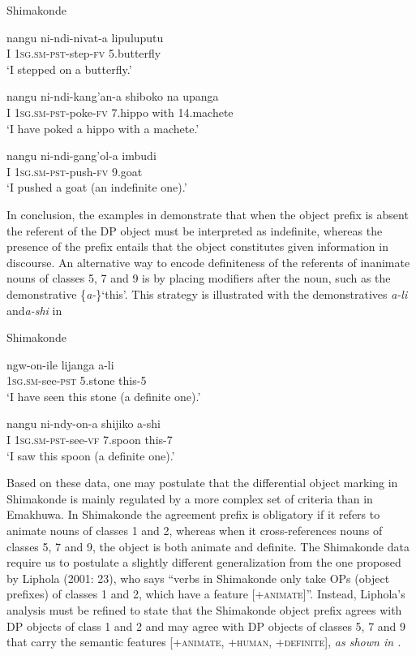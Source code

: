 \documentclass[output=paper]{langsci/langscibook}
\begin{document}
{Shimakonde}

\ea
\gll nangu        ni-ndi-nivat-a                 lipuluputu\\
     I                \textsc{1sg.sm-pst}{}-step-\textsc{fv}        5.butterfly\\
\glt ‘I stepped on a butterfly.’
\z

\ea
\gll nangu        ni-ndi-kang'an-a             shiboko           na       upanga\\
     I                \textsc{1sg.sm-pst}{}-poke-\textsc{fv}       7.hippo            with   14.machete\\
\glt ‘I have poked a hippo with a machete.’
\z

\ea
\gll nangu        ni-ndi-gang'ol-a             imbudi\\
     I                \textsc{1sg.sm-pst}{}-push-\textsc{fv}       9.goat\\
\glt ‘I pushed a goat (an indefinite one).’
\z

{In conclusion, the examples in } {demonstrate that when the object prefix is absent the referent of the DP object must be interpreted as indefinite, whereas the presence of the prefix entails that the object constitutes given information in discourse. }{An alternative way to encode definiteness of the referents of inanimate nouns of classes 5, 7 and 9 is by placing modifiers after the noun, such as the demonstrative \{}{\textit{a-}}{\}}{\textit {}}{‘this’. This strategy is illustrated with the demonstratives }{\textit{a-li }}{and}{\textit {a-shi}} {in }

{{Shimakonde}}

\ea
\gll ngw-on-ile               lijanga        a-li\\
     \textsc{1sg.sm}{}-see-\textsc{pst}       5.stone        this-5\\
\glt ‘I have seen this stone (a definite one).’
\z

\ea
\gll nangu      ni-ndy-on-a                shijiko         a-shi\\
     I              \textsc{1sg.sm-pst}{}-see-\textsc{vf }     7.spoon       this-7\\
\glt ‘I saw this spoon (a definite one).’
\z

{Based on these data, one may postulate that the differential object mar}{king in Shimakonde is mainly regulated by a more complex set of criteria than in }{Emakhuwa}{. In Shimakonde the agreement prefix is obligatory if it refers to animate nouns of classes 1 and 2, whereas when it cross-references nouns of classes 5, 7 and 9, the object is both animate and definite. }{The Shimakonde data require us to postulate a slightly different generalization from the one proposed by Liphola (2001}{: 23), who says “verbs in Shimakonde only take OPs (object prefixes) of classes 1 and 2, which have a feature [+}{\textsc{animate}}{]”. Instead, Liphola’s analysis must be refined to state that the Shimakonde object prefix agrees with DP objects of class 1 and 2 and may agree with DP objects of classes 5, 7 and 9 that carry the semantic features }{\textsc{[+animate, +human, +definite], }}\emph{\textup{as shown in .}}
\end{document}
